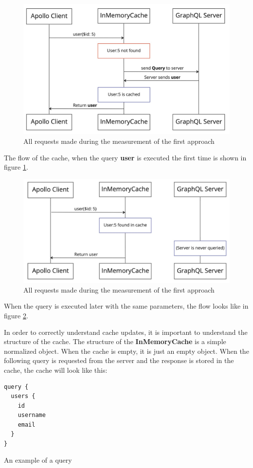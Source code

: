 \ifshowImages
\begin{figure}[H]
\centering
\includegraphics[width=0.6\linewidth]{images/background/apollo/apollo-client-basic-cache.jpeg}
\caption{All requests made during the measurement of the first approach}\label{figure:background:user-query-first-time}
\end{figure}
\fi

The flow of the cache, when the query \textbf{user} is executed the first time is shown in figure \ref{figure:background:user-query-first-time}.

\ifshowImages
\begin{figure}[H]
\centering
\includegraphics[width=0.6\linewidth]{images/background/apollo/apollo-client-basic-cache-warm.jpeg}
\caption{All requests made during the measurement of the first approach}\label{figure:background:user-query-second-time}
\end{figure}
\fi

When the query is executed later with the same parameters, the flow looks like in figure \ref{figure:background:user-query-second-time}.

In order to correctly understand cache updates, it is important to understand the structure of the cache. The structure of the \textbf{InMemoryCache} is a simple normalized object. When the cache is empty, it is just an empty object. When the following query is requested from the server and the response is stored in the cache, the cache will look like this:

\ifshowListings
\begin{listing}[H]
\begin{verbatim}
query {
  users {
    id
    username
    email
  }
}
\end{verbatim}
\caption{An example of a query}\label{code:background:query-user-cache}
\end{listing}
\fi

